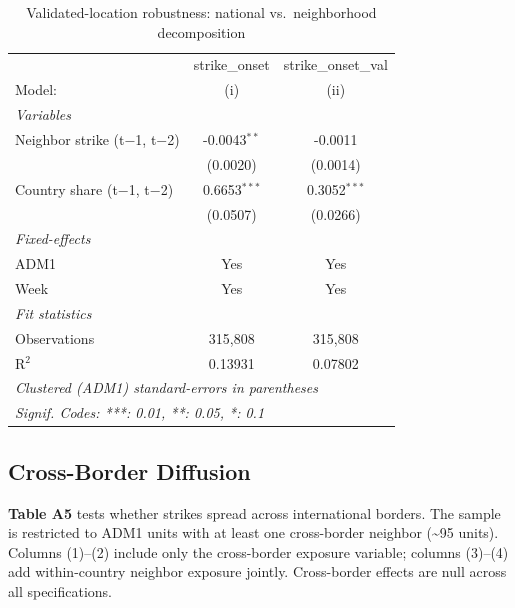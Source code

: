 \documentclass[
  11pt,
]{article}
\begin{document}
\begingroup
\centering
\begin{table}
\caption{Validated-location robustness: national vs.~neighborhood decomposition}\tabularnewline

\centering
\begin{tabular}{lcc}
   \hline
                                  & strike\_onset  & strike\_onset\_val\\    
   Model:                         & (i)            & (ii)\\  
   \midrule
   \emph{Variables}\\
   Neighbor strike (t$-$1, t$-$2) & -0.0043$^{**}$ & -0.0011\\   
                                  & (0.0020)       & (0.0014)\\   
   Country share (t$-$1, t$-$2)   & 0.6653$^{***}$ & 0.3052$^{***}$\\   
                                  & (0.0507)       & (0.0266)\\   
   \midrule
   \emph{Fixed-effects}\\
   ADM1                           & Yes            & Yes\\  
   Week                           & Yes            & Yes\\  
   \midrule
   \emph{Fit statistics}\\
   Observations                   & 315,808        & 315,808\\  
   R$^2$                          & 0.13931        & 0.07802\\  
   \hline
   \multicolumn{3}{l}{\emph{Clustered (ADM1) standard-errors in parentheses}}\\
   \multicolumn{3}{l}{\emph{Signif. Codes: ***: 0.01, **: 0.05, *: 0.1}}\\
\end{tabular}
\end{table}

\par\endgroup

\clearpage

\subsection{Cross-Border Diffusion}\label{cross-border-diffusion}

\textbf{Table A5} tests whether strikes spread across international
borders. The sample is restricted to ADM1 units with at least one
cross-border neighbor (\textasciitilde95 units). Columns (1)--(2)
include only the cross-border exposure variable; columns (3)--(4) add
within-country neighbor exposure jointly. Cross-border effects are null
across all specifications.
\end{document}
